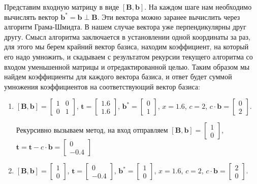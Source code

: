 Представим входную матрицу в виде $ \left[\mathbf{B}, \mathbf{b}\right] $. На каждом шаге нам необходимо вычислять вектор $ \mathbf{b}^* = \mathbf{b} \perp \mathbf{B} $. Эти вектора можно заранее вычислить через алгоритм Грама-Шмидта. В нашем случае вектора уже перпендикулярны друг другу. Смысл алгоритма заключается в установлении одной координаты за раз, для этого мы берем крайний вектор базиса, находим коэффициент, на который его надо умножить, и скадываем с результатом рекурсии текущего алгоритма со входом уменьшенной матрицы и отредактированной целью. Таким образом мы найдем коэффициенты для каждого вектора базиса, и ответ будет суммой умножения коэффициентов на соответствующий вектор базиса:

\begin{enumerate}

\item 
$ \left[\mathbf{B}, \mathbf{b}\right] = \left[\begin{array}{cccc}
1 & 0\\
0 & 1
\end{array}\right] $, $ \mathbf{t} = \left[\begin{array}{cccc}
1.6 \\
1.6
\end{array}\right] $, $ \mathbf{b}^* = \left[\begin{array}{cccc}
0 \\
1
\end{array}\right] $, $ x = 1.6 $, $ c = 2 $, $ c \cdot \mathbf{b} = \left[\begin{array}{cccc}
0 \\
2
\end{array}\right] $.

Рекурсивно вызываем метод, на вход отправляем $ \left[\mathbf{B}, \mathbf{b}\right] = \left[\begin{array}{cccc}
1 \\
0
\end{array}\right] $, $ \mathbf{t} = \mathbf{t} - c \cdot \mathbf{b} = \left[\begin{array}{cccc}
0 \\
-0.4
\end{array}\right] $

\item 
$ \left[\mathbf{B}, \mathbf{b}\right] = \left[\begin{array}{cccc}
1 \\
0
\end{array}\right] $, $ \mathbf{t} = \left[\begin{array}{cccc}
0 \\
-0.4
\end{array}\right] $, $ \mathbf{b}^* = \left[\begin{array}{cccc}
1 \\
0
\end{array}\right] $, $ x = 1.6 $, $ c = 2 $, $ c \cdot \mathbf{b} = \left[\begin{array}{cccc}
2 \\
0
\end{array}\right] $.


\end{enumerate}
